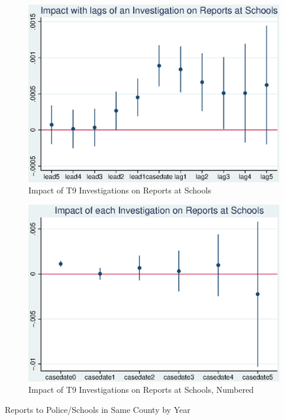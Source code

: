 \documentclass[AER]{AEA}
\begin{document}
\begin{figure}
\includegraphics[width=4.9in]{figures/cases_schools_reports_lags.eps}

\caption{Impact of T9 Investigations on Reports at Schools}
\end{figure}

\begin{figure}
\includegraphics[width=4.9in]{figures/cases_school_reports_numbered.eps}

\caption{Impact of T9 Investigations on Reports at Schools, Numbered}

\end{figure}

\begin{table}
\caption{Reports to Police/Schools in Same County by Year}



\end{table}
\end{document}
